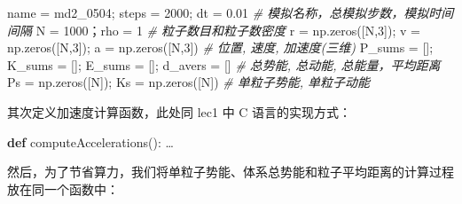 \documentclass[
]{article}
\newenvironment{Shaded}{}{}
\newcommand{\CommentTok}[1]{\textcolor[rgb]{0.38,0.63,0.69}{\textit{#1}}}
\newcommand{\DecValTok}[1]{\textcolor[rgb]{0.25,0.63,0.44}{#1}}
\newcommand{\FloatTok}[1]{\textcolor[rgb]{0.25,0.63,0.44}{#1}}
\newcommand{\KeywordTok}[1]{\textcolor[rgb]{0.00,0.44,0.13}{\textbf{#1}}}
\newcommand{\NormalTok}[1]{#1}
\newcommand{\OperatorTok}[1]{\textcolor[rgb]{0.40,0.40,0.40}{#1}}
\newcommand{\StringTok}[1]{\textcolor[rgb]{0.25,0.44,0.63}{#1}}
\begin{document}
\begin{Shaded}
\begin{Highlighting}[]
\NormalTok{name }\OperatorTok{=} \StringTok{\textquotesingle{}md2\_0504\textquotesingle{}}\OperatorTok{;}\NormalTok{ steps }\OperatorTok{=} \DecValTok{2000}\OperatorTok{;}\NormalTok{ dt }\OperatorTok{=} \FloatTok{0.01}  \CommentTok{\# 模拟名称，总模拟步数，模拟时间间隔}
\NormalTok{N }\OperatorTok{=} \DecValTok{1000}\NormalTok{；rho }\OperatorTok{=} \DecValTok{1}  \CommentTok{\# 粒子数目和粒子数密度}
\NormalTok{r }\OperatorTok{=}\NormalTok{ np.zeros([N,}\DecValTok{3}\NormalTok{])}\OperatorTok{;}\NormalTok{ v }\OperatorTok{=}\NormalTok{ np.zeros([N,}\DecValTok{3}\NormalTok{])}\OperatorTok{;}\NormalTok{ a }\OperatorTok{=}\NormalTok{ np.zeros([N,}\DecValTok{3}\NormalTok{])  }\CommentTok{\# 位置, 速度, 加速度(三维)}
\NormalTok{P\_sums }\OperatorTok{=}\NormalTok{ []}\OperatorTok{;}\NormalTok{ K\_sums }\OperatorTok{=}\NormalTok{ []}\OperatorTok{;}\NormalTok{ E\_sums }\OperatorTok{=}\NormalTok{ []}\OperatorTok{;}\NormalTok{ d\_avers }\OperatorTok{=}\NormalTok{ []  }\CommentTok{\# 总势能, 总动能, 总能量，平均距离}
\NormalTok{Ps }\OperatorTok{=}\NormalTok{ np.zeros([N])}\OperatorTok{;}\NormalTok{ Ks }\OperatorTok{=}\NormalTok{ np.zeros([N])  }\CommentTok{\# 单粒子势能, 单粒子动能}
\end{Highlighting}
\end{Shaded}

其次定义加速度计算函数，此处同 lec1 中 C 语言的实现方式：

\begin{Shaded}
\begin{Highlighting}[]
\KeywordTok{def}\NormalTok{ computeAccelerations():}
\NormalTok{…}
\end{Highlighting}
\end{Shaded}

然后，为了节省算力，我们将单粒子势能、体系总势能和粒子平均距离的计算过程放在同一个函数中：
\end{document}
